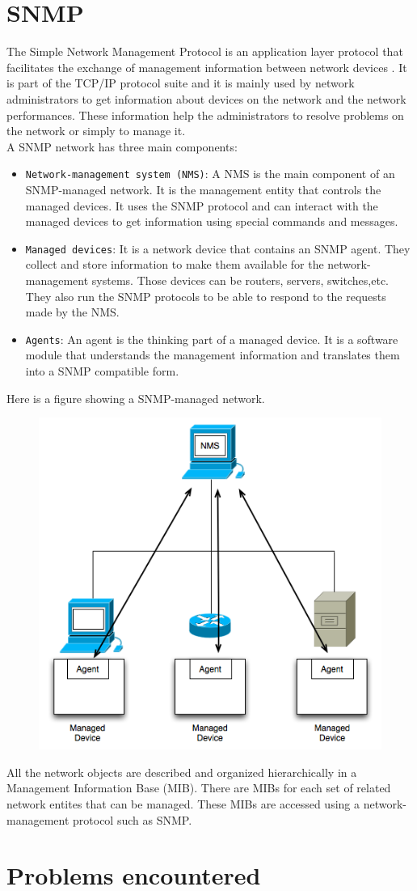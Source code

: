 \section{SNMP}
The Simple Network Management Protocol is an application layer protocol that facilitates the exchange of management information between network devices \cite{snmp}. It is part of the TCP/IP protocol suite and it is mainly used by network administrators to get information about devices on the network and the network performances. These information help the administrators to resolve problems on the network or simply to manage it.\\
A SNMP network has three main components:
\begin{itemize}
	\item \texttt{Network-management system (NMS)}: A NMS is the main component of an SNMP-managed network. It is the management entity that controls the managed devices. It uses the SNMP protocol and can interact with the managed devices to get information using special commands and messages.
	
	\item \texttt{Managed devices}: It is a network device that contains an SNMP agent. They collect and store information to make them available for the network-management systems. Those devices can be routers, servers, switches,etc. They also run the SNMP protocols to be able to respond to the requests made by the NMS.
	
	\item \texttt{Agents}: An agent is the thinking part of a managed device. It is a software module that understands the management information and translates them into a SNMP compatible form.
\end{itemize}
Here is a figure showing a SNMP-managed network.
\begin{figure}[H]
	\includegraphics[width=.7\linewidth]{Pictures/Chapter3/snmp.png}
\end{figure}

All the network objects are described and organized hierarchically in a Management Information Base (MIB). There are MIBs for each set of related network entites that can be managed. These MIBs are accessed using a network-management protocol such as SNMP.


\section{Problems encountered}